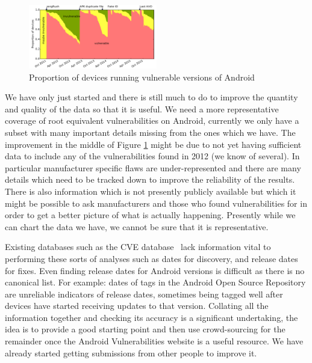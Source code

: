 \documentclass[a4paper,twocolumn]{article}
\begin{document}
\begin{figure}
 \includegraphics[width=0.5\textwidth]{figures/proportioninsecure.pdf}
 \caption{Proportion of devices running vulnerable versions of Android}
 \label{fig:propinsecure}
\end{figure}

We have only just started and there is still much to do to improve the quantity and quality of the data so that it is useful.
We need a more representative coverage of root equivalent vulnerabilities on Android, currently we only have a subset with many important details missing from the ones which we have.
The improvement in the middle of Figure \ref{fig:propinsecure} might be due to not yet having sufficient data to include any of the vulnerabilities found in 2012 (we know of several).
In particular manufacturer specific flaws are under-represented and there are many details which need to be tracked down to improve the reliability of the results.
There is also information which is not presently publicly available but which it might be possible to ask manufacturers and those who found vulnerabilities for in order to get a better picture of what is actually happening.
Presently while we can chart the data we have, we cannot be sure that it is representative.

Existing databases such as the CVE database~\cite{cve-details} lack information vital to performing these sorts of analyses such as dates for discovery, and release dates for fixes.
Even finding release dates for Android versions is difficult as there is no canonical list.
For example: dates of tags in the Android Open Source Repository are unreliable indicators of release dates, sometimes being tagged well after devices have started receiving updates to that version.
Collating all the information together and checking its accuracy is a significant undertaking, the idea is to provide a good starting point and then use crowd-sourcing for the remainder once the Android Vulnerabilities website is a useful resource.
We have already started getting submissions from other people to improve it.
\end{document}
